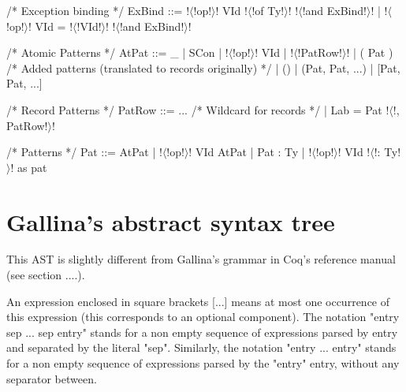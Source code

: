 \documentclass[a4paper,11pt]{article}
\begin{document}
\begin{grm}
/* Exception binding */
ExBind ::= !$\langle$!op!$\rangle$! VId !$\langle$!of Ty!$\rangle$! !$\langle$!and ExBind!$\rangle$!
         | !$\langle$!op!$\rangle$! VId = !$\langle$!VId!$\rangle$! !$\langle$!and ExBind!$\rangle$!

/* Atomic Patterns */
AtPat ::= _ 
        | SCon
        | !$\langle$!op!$\rangle$! VId 
        | { !$\langle$!PatRow!$\rangle$! }
        | ( Pat )
        /* Added patterns (translated to records originally) */
        | ()
        | (Pat, Pat, ...)
        | [Pat, Pat, ...]

/* Record Patterns */
PatRow ::= ... /* Wildcard for records */
         | Lab = Pat !$\langle$!, PatRow!$\rangle$!

/* Patterns */
Pat ::= AtPat
      | !$\langle$!op!$\rangle$! VId AtPat
      | Pat : Ty
      | !$\langle$!op!$\rangle$! VId !$\langle$!: Ty!$\rangle$! as pat
\end{grm}

\section{Gallina's abstract syntax tree}

This AST is slightly different from Gallina's grammar in Coq's reference manual
(see section ....).

An expression enclosed in square brackets [...] means at
most one occurrence of this expression (this corresponds to an optional
component). The notation "entry sep ... sep entry" stands for a non empty sequence
of expressions parsed by entry and separated by the literal "sep". Similarly,
the notation "entry ... entry" stands for a non empty sequence of expressions
parsed by the "entry" entry, without any separator between.
\end{document}
